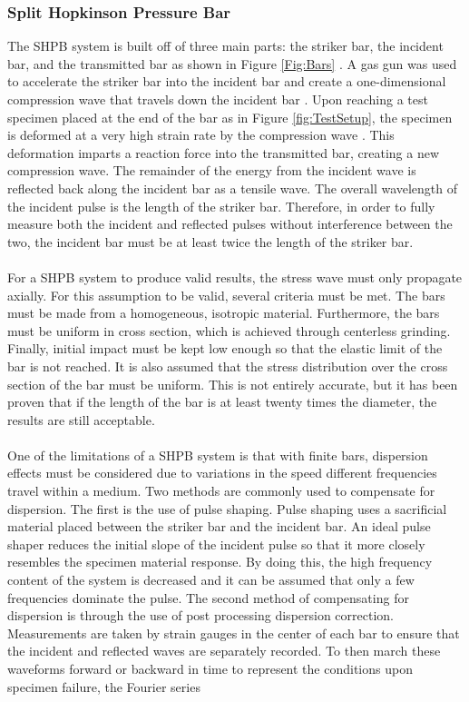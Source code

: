 \documentclass[12pt]{article}
\begin{document}
\subsubsection {Split Hopkinson Pressure Bar} %
The SHPB system is built off of three main parts: the striker bar, the incident bar, and the transmitted bar as shown in Figure \ref{Fig:Bars} \cite{Frew2002} \cite{Follansbee} \cite{Frew}. A gas gun was used to accelerate the striker bar into the incident bar and create a one-dimensional compression wave that travels down the incident bar \cite{Frew}. Upon reaching a test specimen placed at the end of the bar as in Figure \ref{fig:TestSetup}, the specimen is deformed at a very high strain rate by the compression wave \cite{Dai}. This deformation imparts a reaction force into the transmitted bar, creating a new compression wave. The remainder of the energy from the incident wave is reflected back along the incident bar as a tensile wave. The overall wavelength of the incident pulse is the length of the striker bar. Therefore, in order to fully measure both the incident and reflected pulses without interference between the two, the incident bar must be at least twice the length of the striker bar.
\\ \\
For a SHPB system to produce valid results, the stress wave must only propagate axially. For this assumption to be valid, several criteria must be met. The bars must be made from a homogeneous, isotropic material. Furthermore, the bars must be uniform in cross section, which is achieved through centerless grinding. Finally, initial impact must be kept low enough so that the elastic limit of the bar is not reached. It is also assumed that the stress distribution over the cross section of the bar must be uniform. This is not entirely accurate, but it has been proven that if the length of the bar is at least twenty times the diameter, the results are still acceptable. 
\\ \\
One of the limitations of a SHPB system is that with finite bars, dispersion effects must be considered due to variations in the speed different frequencies travel within a medium. Two methods are commonly used to compensate for dispersion. The first is the use of pulse shaping. Pulse shaping uses a sacrificial material placed between the striker bar and the incident bar. An ideal pulse shaper reduces the initial slope of the incident pulse so that it more closely resembles the specimen material response. By doing this, the high frequency content of the system is decreased and it can be assumed that only a few frequencies dominate the pulse. The second method of compensating for dispersion is through the use of post processing dispersion correction. Measurements are taken by strain gauges in the center of each bar to ensure that the incident and reflected waves are separately recorded. To then march these waveforms forward or backward in time to represent the conditions upon specimen failure, the Fourier series
\end{document}
